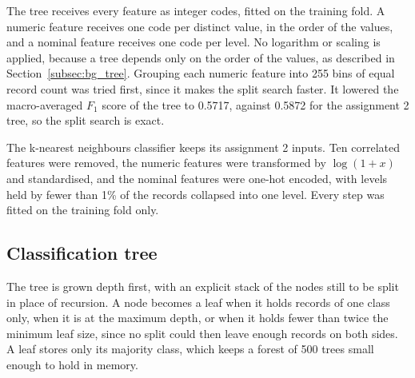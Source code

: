 \documentclass[conference,10pt]{IEEEtran}
\begin{document}
The tree receives every feature as integer codes, fitted on the training
fold. A numeric feature receives one code per distinct value, in the order
of the values, and a nominal feature receives one code per level. No
logarithm or scaling is applied, because a tree depends only on the order of
the values, as described in Section~\ref{subsec:bg_tree}. Grouping each numeric feature
into 255 bins of equal record count was tried first, since it makes the
split search faster. It lowered the macro-averaged $F_1$ score of the tree
to 0.5717, against 0.5872 for the assignment 2 tree, so the split search is
exact.

The k-nearest neighbours classifier keeps its assignment 2 inputs. Ten
correlated features were removed, the numeric features were transformed by
$\log(1+x)$ and standardised, and the nominal features were one-hot encoded,
with levels held by fewer than 1\% of the records collapsed into one level.
Every step was fitted on the training fold only.

\subsection{Classification tree}
\label{subsec:impl_tree}

The tree is grown depth first, with an explicit stack of the nodes still to
be split in place of recursion. A node becomes a leaf when it holds records
of one class only, when it is at the maximum depth, or when it holds fewer
than twice the minimum leaf size, since no split could then leave enough
records on both sides. A leaf stores only its majority class, which keeps a
forest of 500 trees small enough to hold in memory.
\end{document}
